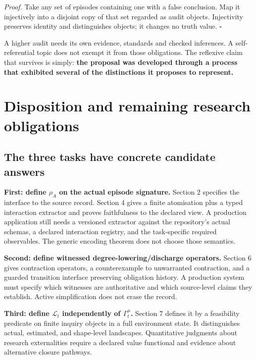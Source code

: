\documentclass[11pt,a4paper]{article}
\begin{document}
\emph{Proof.} Take any set of episodes containing one with a false
conclusion. Map it injectively into a disjoint copy of that set regarded
as audit objects. Injectivity preserves identity and distinguishes
objects; it changes no truth value. \(\square\)

A higher audit needs its own evidence, standards and checked inferences.
A self-referential topic does not exempt it from those obligations. The
reflexive claim that survives is simply: \textbf{the proposal was
developed through a process that exhibited several of the distinctions
it proposes to represent.}

\section{Disposition and remaining research
obligations}\label{disposition-and-remaining-research-obligations}

\subsection{The three tasks have concrete candidate
answers}\label{the-three-tasks-have-concrete-candidate-answers}

\textbf{First: define \(\rho_A\) on the actual episode signature.}
Section 2 specifies the interface to the source record. Section 4 gives
a finite atomisation plus a typed interaction extractor and proves
faithfulness to the declared view. A production application still needs
a versioned extractor against the repository's actual schemas, a
declared interaction registry, and the task-specific required
observables. The generic encoding theorem does not choose those
semantics.

\textbf{Second: define witnessed degree-lowering/discharge operators.}
Section 6 gives contraction operators, a counterexample to unwarranted
contraction, and a guarded transition interface preserving obligation
history. A production system must specify which witnesses are
authoritative and which source-level claims they establish. Active
simplification does not erase the record.

\textbf{Third: define \(\mathcal L_t\) independently of
\(\Gamma_t^\mu\).} Section 7 defines it by a feasibility predicate on
finite inquiry objects in a full environment state. It distinguishes
actual, estimated, and shape-level landscapes. Quantitative judgments
about research externalities require a declared value functional and
evidence about alternative closure pathways.
\end{document}
